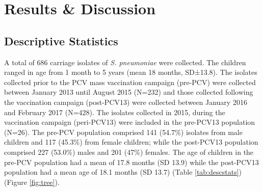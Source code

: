 \documentclass{article}
\begin{document}
\section{Results \& Discussion}
\subsection{Descriptive Statistics}
A total of 686 carriage isolates of \textit{S. pneumoniae} were collected. The children ranged in age from 1 month to 5 years (mean 18 months, SD±13.8). The isolates collected prior to the PCV mass vaccination campaign  (pre-PCV) were collected between January 2013 until August 2015 (N=232) and those collected following the vaccination campaign (post-PCV13) were collected between January 2016 and February 2017 (N=428). The isolates collected in 2015, during the vaccination campaign (peri-PCV13) were included in the pre-PCV13 population (N=26). The pre-PCV population comprised 141 (54.7\%) isolates from male children and 117 (45.3\%) from female children; while the post-PCV13 population comprised 227 (53.0\%) males and 201 (47\%) females. The age of children in the pre-PCV population had a mean of 17.8 months (SD 13.9) while the post-PCV13 population had a mean age of 18.1 months (SD 13.7) (Table \ref{tab:descstats})(Figure \ref{fig:tree}). 
\end{document}
